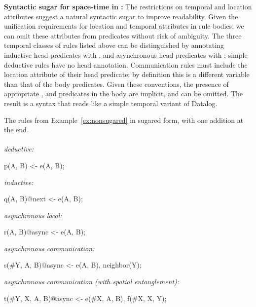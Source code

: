\noindent
\textbf{Syntactic sugar for space-time in \lang:}
The restrictions on temporal and location attributes suggest a natural syntactic sugar to improve readability.  Given the unification requirements for location and temporal attributes in rule bodies, we can omit these attributes from predicates without risk of ambiguity.  
The three temporal classes of rules listed above can be distinguished by annotating inductive head predicates with , and asynchronous head predicates with ; simple deductive rules have no head annotation. 
Communication rules must include the location attribute of their head predicate; by definition this is a different variable than that of the body predicates.
 Given these conventions, the presence of appropriate ,  and  predicates in the body are implicit, and can be omitted.  The result is a syntax that reads like a simple temporal variant of Datalog.
\begin{example}
\label{ex:sugared}
The rules from Example~\ref{ex:nonsugared} in sugared form, with one addition at the end.
\\\\
\textit{deductive:}\\
\begin{Dedalus}
p(A, B) <- e(A, B);
\end{Dedalus}
\textit{inductive:}\\
\begin{Dedalus}
q(A, B)@next <- e(A, B);
\end{Dedalus}
\textit{asynchronous local:}\\
\begin{Dedalus}
r(A, B)@async <- e(A, B);
\end{Dedalus}
\textit{asynchronous communication:}\\
\begin{Dedalus}
s(#Y, A, B)@async <- e(A, B), neighbor(Y);
\end{Dedalus}
\textit{asynchronous communication (with spatial entanglement):}\\
\begin{Dedalus}
t(#Y, X, A, B)@async <- e(#X, A, B), f(#X, X, Y);
\end{Dedalus}
\end{example}

